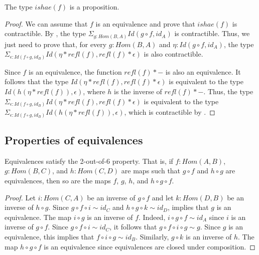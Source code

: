 \documentclass[reqno]{amsart}
\theoremstyle{definition}
\theoremstyle{remark}
\newcommand{\fs}[1]{\mathit{#1}}
\newcommand{\Hom}{\fs{Hom}}
\newcommand{\Id}{\fs{Id}}
\newcommand{\refl}{\fs{refl}}
\newcommand{\id}{\fs{id}}
\numberwithin{figure}{section}
\begin{document}
\begin{prop}
The type $\fs{ishae}(f)$ is a proposition.
\end{prop}
\begin{proof}
We can assume that $f$ is an equivalence and prove that $\fs{ishae}(f)$ is contractible.
By , the type $\Sigma_{g : \Hom(B,A)} \Id(g \circ f, \id_A)$ is contractible.
Thus, we just need to prove that, for every $g : \Hom(B,A)$ and $\eta : \Id(g \circ f, \id_A)$, the type $\Sigma_{\epsilon : \Id(f \circ g, \id_B)} \Id(\eta * \refl(f), \refl(f) * \epsilon)$ is also contractible.

Since $f$ is an equivalence, the function $\refl(f) * -$ is also an equivalence.
It follows that the type $\Id(\eta * \refl(f), \refl(f) * \epsilon)$ is equivalent to the type $\Id(h(\eta * \refl(f)), \epsilon)$, where $h$ is the inverse of $\refl(f) * -$.
Thus, the type $\Sigma_{\epsilon : \Id(f \circ g, \id_B)} \Id(\eta * \refl(f), \refl(f) * \epsilon)$ is equivalent to the type $\Sigma_{\epsilon : \Id(f \circ g, \id_B)} \Id(h(\eta * \refl(f)), \epsilon)$, which is contractible by \cite[Lemma~3.11.8]{hottbook}.
\end{proof}

\subsection{Properties of equivalences}

\begin{prop}
Equivalences satisfy the 2-out-of-6 property.
That is, if $f : \Hom(A,B)$, $g : \Hom(B,C)$, and $h : \Hom(C,D)$ are maps such that $g \circ f$ and $h \circ g$ are equivalences, then so are the maps $f$, $g$, $h$, and $h \circ g \circ f$.
\end{prop}
\begin{proof}
Let $i : \Hom(C,A)$ be an inverse of $g \circ f$ and let $k : \Hom(D,B)$ be an inverse of $h \circ g$.
Since $g \circ f \circ i \sim \id_C$ and $h \circ g \circ k \sim \id_D$,  implies that $g$ is an equivalence.
The map $i \circ g$ is an inverse of $f$.
Indeed, $i \circ g \circ f \sim \id_A$ since $i$ is an inverse of $g \circ f$.
Since $g \circ f \circ i \sim \id_C$, it follows that $g \circ f \circ i \circ g \sim g$.
Since $g$ is an equivalence, this implies that $f \circ i \circ g \sim \id_B$.
Similarly, $g \circ k$ is an inverse of $h$.
The map $h \circ g \circ f$ is an equivalence since equivalences are closed under composition.
\end{proof}
\end{document}
